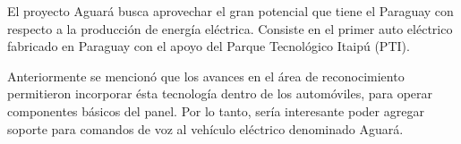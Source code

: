 El proyecto Aguar\'a busca aprovechar el gran potencial que tiene el Paraguay con respecto a la producci\'on de
energ\'ia el\'ectrica. Consiste en el primer auto el\'ectrico fabricado en Paraguay con el apoyo del Parque
Tecnol\'ogico Itaip\'u (PTI). 

Anteriormente se mencion\'o que los avances en el \'area de reconocimiento
permitieron incorporar \'esta tecnolog\'ia dentro de los autom\'oviles, para operar componentes b\'asicos del panel. Por lo tanto,
ser\'ia interesante poder agregar soporte para comandos de voz al veh\'iculo el\'ectrico denominado Aguar\'a.